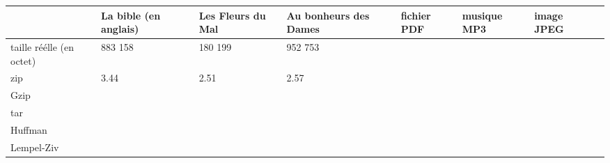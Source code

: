 \documentclass{report}
\begin{document}
\begin{center}
{\renewcommand{\arraystretch}{2}
\begin{tabular}{|p{1.5cm}|p{1.5cm}|p{1.5cm}|p{1.5cm}|p{1.5cm}|p{1.5cm}|p{1.5cm}|p{1.5cm}|}
\hline
 & La bible (en anglais)  & Les Fleurs du Mal  & Au bonheurs des Dames & fichier PDF & musique  MP3 & image JPEG  \\
\hline
taille réélle (en octet)  & 883 158 & 180 199 & 952 753 &  & & \\\hline
zip & 3.44  & 2.51 & 2.57 & & & \\
\hline
Gzip & & & & & & \\
\hline
tar & & & & & & \\
\hline
Huffman & & & & & & \\
\hline
Lempel-Ziv & & & & & & \\
\hline

\end{tabular}
}
\end{center}
\end{document}
